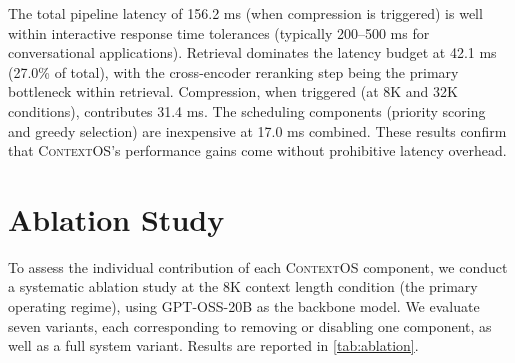 \documentclass[review,12pt]{elsarticle}
\newcommand{\contextos}{\textsc{ContextOS}}
\begin{document}
The total pipeline latency of 156.2 ms (when compression is triggered) is well
within interactive response time tolerances (typically 200--500 ms for
conversational applications).  Retrieval dominates the latency budget at
42.1 ms (27.0\% of total), with the cross-encoder reranking step being the
primary bottleneck within retrieval.  Compression, when triggered (at 8K and
32K conditions), contributes 31.4 ms.  The scheduling components (priority
scoring and greedy selection) are inexpensive at 17.0 ms combined.  These
results confirm that \contextos{}'s performance gains come without prohibitive
latency overhead.

\section{Ablation Study}
\label{sec:ablation}

To assess the individual contribution of each \contextos{} component, we
conduct a systematic ablation study at the 8K context length condition
(the primary operating regime), using GPT-OSS-20B as the backbone model.
We evaluate seven variants, each corresponding to removing or disabling one
component, as well as a full system variant.  Results are reported in
\cref{tab:ablation}.
\end{document}
